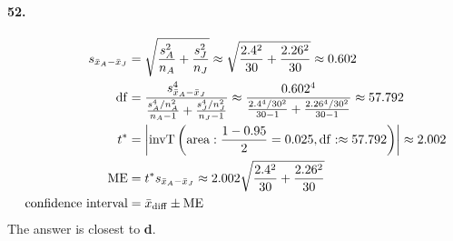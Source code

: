 \documentclass[../Homework]{subfiles}
\begin{document}
			\paragraph{52.}
				\begin{align*}
					s_{\bar{x}_A - \bar{x}_J} &= \sqrt{\frac{s_A^2}{n_A} + \frac{s_J^2}{n_J}} \approx \sqrt{\frac{2.4^2}{30} + \frac{2.26^2}{30}} \approx 0.602 \\
					\operatorname{df} &= \frac{s_{\bar{x}_A - \bar{x}_J}^4}{\frac{s_A^4/n_A^2}{n_A - 1} + \frac{s_J^4/n_J^2}{n_J - 1}} \approx \frac{0.602^4}{\frac{2.4^4/30^2}{30 - 1} + \frac{2.26^4/30^2}{30 - 1}} \approx 57.792 \\
					t^* &= \left|\operatorname{invT}\left(\operatorname{area}: \frac{1 - 0.95}{2} = 0.025, \operatorname{df}: \approx 57.792\right)\right| \approx 2.002 \\
					\operatorname{ME} &= t^*s_{\bar{x}_A - \bar{x}_J} \approx 2.002\sqrt{\frac{2.4^2}{30} + \frac{2.26^2}{30}} \\
					\text{confidence interval} &= \bar{x}_{\mathrm{diff}} \pm \operatorname{ME}
				\end{align*}
				The answer is closest to \textbf{d}.
\end{document}

